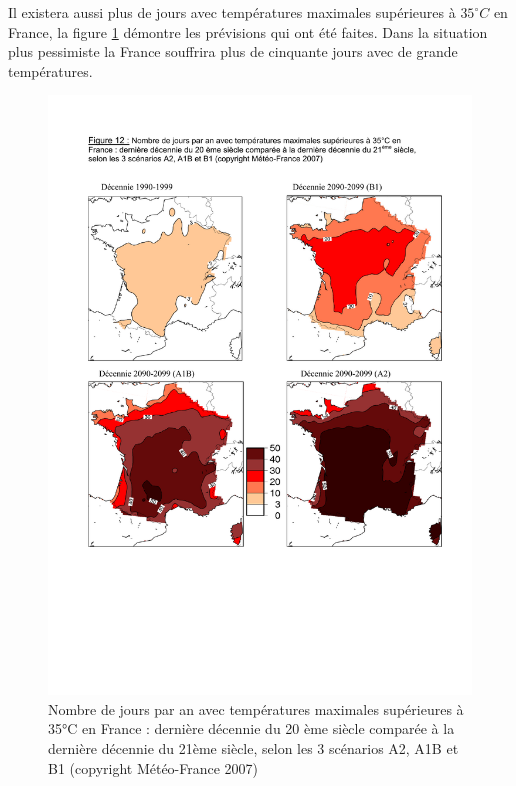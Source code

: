 \documentclass[a4paper,11pt]{article}
\begin{document}
Il  existera aussi  plus  de  jours avec  températures  maximales supérieures  à
$35^{\circ}C$ en  France, la  figure \ref{fig:35france} démontre  les prévisions
qui ont été  faites. Dans la situation plus pessimiste  la France souffrira plus
de cinquante jours avec de grande températures. 

\begin{figure}[H]
  \begin{centering}
    \includegraphics[scale=0.6]{fig/35france}
    \par\end{centering}
  \caption{Nombre de jours par an avec températures maximales supérieures à 35°C en France : dernière décennie du 20 ème siècle comparée à la dernière décennie du 21ème siècle, selon les 3 scénarios A2, A1B et B1 (copyright Météo-France 2007)}
  \label{fig:35france}
\end{figure}
\end{document}
